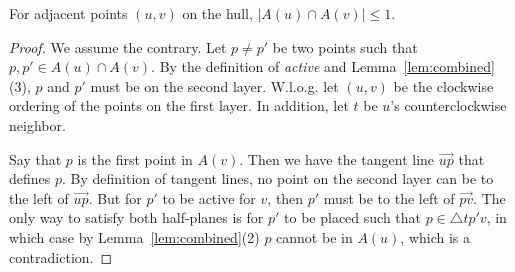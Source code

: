 \documentclass{cccg24}
\newcommand{\Tri}[3]{\triangle #1#2#3}
\newcommand{\hp}[1]{\overrightarrow{#1}}
\newenvironment{customlemma}[1]
  {\renewcommand\theinnercustomthm{#1}\innercustomthm}
  {\endinnercustomthm}
\begin{document}
\begin{customlemma}{\ref{lem:combined}(5)}
    For adjacent points $(u, v)$ on the hull, $|A(u) \cap A(v)| \leq 1$.
\end{customlemma}
\begin{proof}
We assume the contrary. Let $p \neq p'$ be two points such that $p, p' \in A(u) \cap A(v)$. By the definition of \emph{active} and Lemma~\ref{lem:combined}(3), $p$ and $p'$ must be on the second layer. W.l.o.g. let $(u, v)$ be the clockwise ordering of the points on the first layer. In addition, let $t$ be $u$'s counterclockwise neighbor. 

Say that $p$ is the first point in $A(v)$. Then we have the tangent line $\hp{up}$ that defines $p$. By definition of tangent lines, no point on the second layer can be to the left of $\hp{up}$. But for $p'$ to be active for $v$, then $p'$ must be to the left of $\hp{pv}$. The only way to satisfy both half-planes is for $p'$ to be placed such that $p \in \Tri{t}{p'}{v}$, in which case by Lemma~\ref{lem:combined}(2) $p$ cannot be in $A(u)$, which is a contradiction. %

\end{proof}
\end{document}

